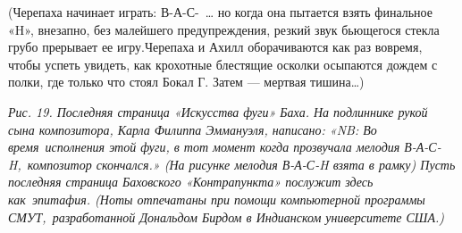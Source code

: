 (Черепаха начинает играть: В-А-С-~\ldots{} но когда она пытается взять финальное «H», внезапно, без малейшего предупреждения, резкий звук бьющегося стекла грубо прерывает ее игру.Черепаха и Ахилл оборачиваются как раз вовремя, чтобы успеть увидеть, как крохотные блестящие осколки осыпаются дождем с полки, где только что стоял Бокал Г. Затем --- мертвая тишина\ldots)

\emph{Рис. 19. Последняя страница «Искусства фуги» Баха. На подлиннике рукой сына композитора, Карла Филиппа Эммануэля, написано: «NB: Во время~исполнения этой фуги, в тот момент когда прозвучала мелодия В-А-С-H,~композитор скончался.» (На рисунке мелодия В-А-С-H взята в рамку) Пусть последняя страница Баховского «Контрапункта» послужит здесь как~эпитафия. (Ноты отпечатаны при помощи компьютерной программы СМУТ,~разработанной Дональдом Бирдом в Индианском университете США.)}
